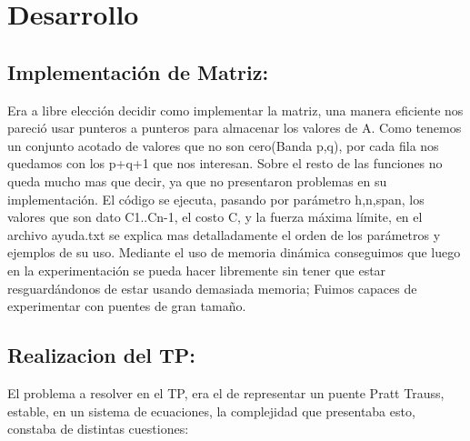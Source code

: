 \section{Desarrollo}

\subsection{Implementaci\'on de Matriz:}

Era a libre elecci\'on decidir como implementar la matriz, una manera eficiente nos pareci\'o usar punteros a punteros para almacenar los valores de A. Como tenemos un conjunto acotado de valores que no son cero(Banda p,q), por cada fila nos quedamos con los p+q+1 que nos interesan. Sobre el resto de las funciones no queda mucho mas que decir, ya que no presentaron problemas en su implementaci\'on. El c\'odigo se ejecuta, pasando por par\'ametro h,n,span, los valores que son dato C1..Cn-1, el costo C, y la fuerza m\'axima l\'imite, en el archivo ayuda.txt se explica mas detalladamente el orden de los par\'ametros y ejemplos de su uso.\newline
Mediante el uso de memoria din\'amica conseguimos que luego en la experimentaci\'on se pueda hacer libremente sin tener que estar resguard\'andonos de estar usando demasiada memoria; Fuimos capaces de experimentar con puentes de gran tama\~{n}o.

\subsection{Realizacion del TP:}

El problema a resolver en el TP, era el de representar un puente Pratt Trauss, estable, en un sistema de ecuaciones, la complejidad que presentaba esto, constaba de distintas cuestiones:

